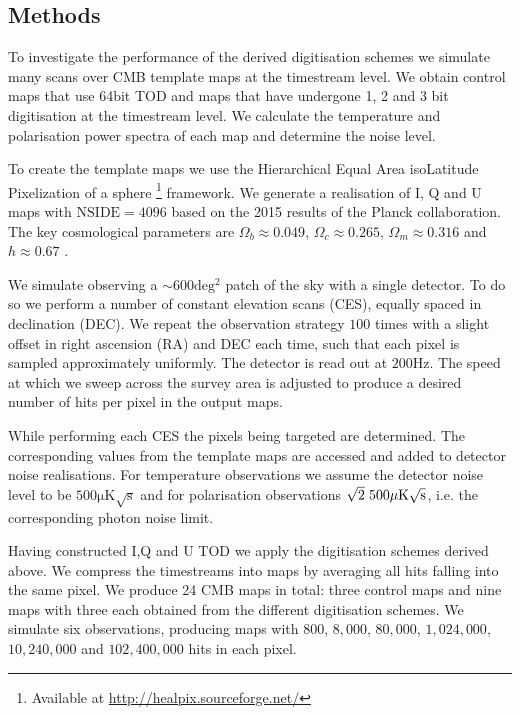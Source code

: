 \documentclass[apj]{emulateapj}
\begin{document}
\subsection{Methods}
\label{subsec:method}

To investigate the performance of the derived digitisation schemes we simulate many scans over CMB template maps at the timestream level. We obtain control maps that use 64bit TOD and maps that have undergone 1, 2 and 3 bit digitisation at the timestream level. We calculate the temperature and polarisation power spectra of each map and determine the noise level.

To create the template maps we use the Hierarchical Equal Area isoLatitude Pixelization of a sphere \citep[HEALPix;][]{healpix}\footnote{Available at \url{http://healpix.sourceforge.net/}} framework. We generate a realisation of I, Q and U maps with $\mathrm{NSIDE} = 4096$ based on the 2015 results of the Planck collaboration. The key cosmological parameters are $\Omega_b \approx 0.049 $, $\Omega_c \approx 0.265$, $\Omega_m \approx 0.316$ and $h \approx 0.67$ \citep{planck2016}.


We simulate observing a $\sim 600 \mathrm{deg^2}$ patch of the sky with a single detector. To do so we perform a number of constant elevation scans (CES), equally spaced in declination (DEC). We repeat the observation strategy $100$ times with a slight offset in right ascension (RA) and DEC each time, such that each pixel is sampled approximately uniformly. The detector is read out at $200 \mathrm{Hz}$. The speed at which we sweep across the survey area is adjusted to produce a desired number of hits per pixel in the output maps.

While performing each CES the pixels being targeted are determined. The corresponding values from the template maps are accessed and added to detector noise realisations. For temperature observations we assume the detector noise level to be $500 \mathrm{\mu K \sqrt{s}}$ and for polarisation observations $\sqrt{2} \hspace{0.7ex} 500 \mathrm{\mu K \sqrt{s}}$, i.e. the corresponding photon noise limit.

Having constructed I,Q and U TOD we apply the digitisation schemes derived above. We compress the timestreams into maps by averaging all hits falling into the same pixel. We produce 24 CMB maps in total: three control maps and nine maps with three each obtained from the different digitisation schemes. We simulate six observations, producing maps with $800$, $8,000$, $80,000$, $1,024,000$, $10,240,000$ and $102,400,000$ hits in each pixel.
\end{document}
